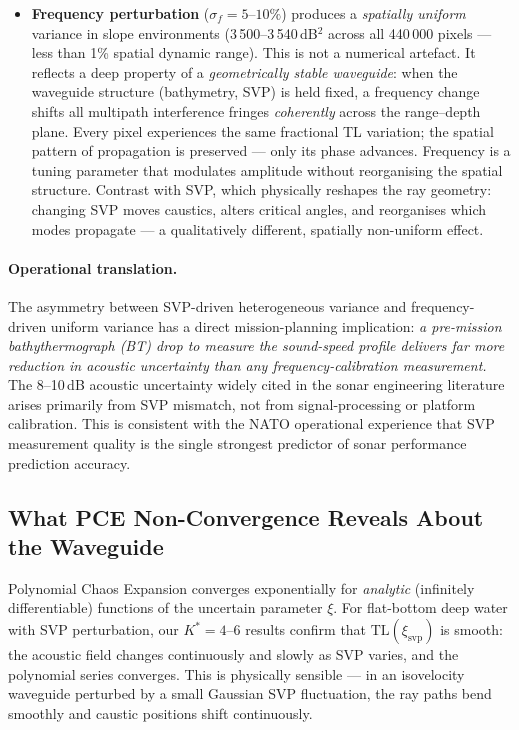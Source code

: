 \documentclass[11pt,a4paper]{article}
\begin{document}
\begin{itemize}
  \item \textbf{Frequency perturbation} ($\sigma_f = 5$--$10\%$) produces a
        \emph{spatially uniform} variance in slope environments
        (3\,500--3\,540\,dB$^2$ across all 440\,000 pixels --- less than 1\% spatial
        dynamic range).
        This is not a numerical artefact.
        It reflects a deep property of a \emph{geometrically stable waveguide}: when
        the waveguide structure (bathymetry, SVP) is held fixed, a frequency change
        shifts all multipath interference fringes \emph{coherently} across the
        range--depth plane.
        Every pixel experiences the same fractional TL variation; the spatial pattern of
        propagation is preserved --- only its phase advances.
        Frequency is a tuning parameter that modulates amplitude without reorganising
        the spatial structure.
        Contrast with SVP, which physically reshapes the ray geometry: changing SVP
        moves caustics, alters critical angles, and reorganises which modes propagate ---
        a qualitatively different, spatially non-uniform effect.

\end{itemize}

\paragraph{Operational translation.}
The asymmetry between SVP-driven heterogeneous variance and frequency-driven uniform variance
has a direct mission-planning implication:
\emph{a pre-mission bathythermograph (BT) drop to measure the sound-speed profile
delivers far more reduction in acoustic uncertainty than any frequency-calibration
measurement.}
The 8--10\,dB acoustic uncertainty widely cited in the sonar engineering literature
arises primarily from SVP mismatch, not from signal-processing or platform calibration.
This is consistent with the NATO operational experience that SVP measurement quality
is the single strongest predictor of sonar performance prediction accuracy.

\subsection{What PCE Non-Convergence Reveals About the Waveguide}
\label{sec:pce_physics}

Polynomial Chaos Expansion converges exponentially for \emph{analytic} (infinitely
differentiable) functions of the uncertain parameter $\xi$.
For flat-bottom deep water with SVP perturbation, our $K^* = 4$--$6$ results confirm
that $\mathrm{TL}(\xi_\text{svp})$ is smooth: the acoustic field changes continuously
and slowly as SVP varies, and the polynomial series converges.
This is physically sensible --- in an isovelocity waveguide perturbed by a small Gaussian
SVP fluctuation, the ray paths bend smoothly and caustic positions shift continuously.
\end{document}
